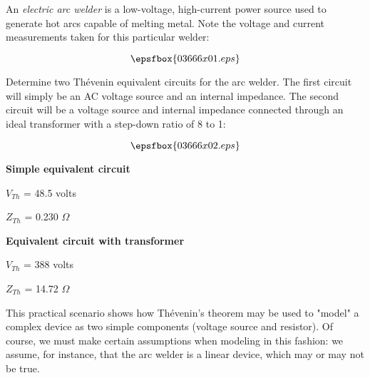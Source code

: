 

An {\it electric arc welder} is a low-voltage, high-current power source used to generate hot arcs capable of melting metal.  Note the voltage and current measurements taken for this particular welder:

$$\epsfbox{03666x01.eps}$$

Determine two Th\'evenin equivalent circuits for the arc welder.  The first circuit will simply be an AC voltage source and an internal impedance.  The second circuit will be a voltage source and internal impedance connected through an ideal transformer with a step-down ratio of 8 to 1:

$$\epsfbox{03666x02.eps}$$







\noindent
{\bf Simple equivalent circuit}

$V_{Th}$ = 48.5 volts

$Z_{Th}$ = 0.230 $\Omega$

\vskip 10pt

\noindent
{\bf Equivalent circuit with transformer}

$V_{Th}$ = 388 volts

$Z_{Th}$ = 14.72 $\Omega$







This practical scenario shows how Th\'evenin's theorem may be used to "model" a complex device as two simple components (voltage source and resistor).  Of course, we must make certain assumptions when modeling in this fashion: we assume, for instance, that the arc welder is a linear device, which may or may not be true.




